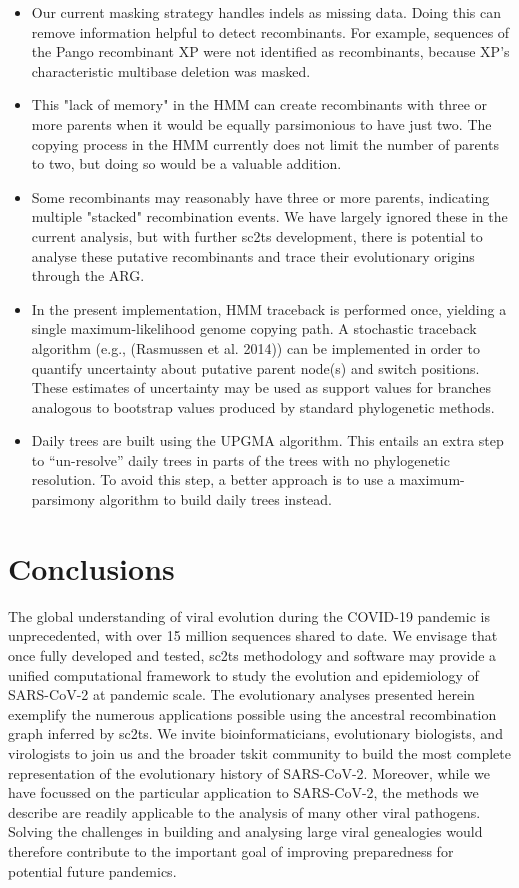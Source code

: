 \documentclass{article}
\begin{document}
\begin{itemize}
\item Our current masking strategy handles indels as missing data. Doing this can remove information helpful to detect recombinants. For example, sequences of the Pango recombinant XP were not identified as recombinants, because XP’s characteristic multibase deletion was masked.
\item This "lack of memory" in the HMM can create recombinants with three or more parents when it would be equally parsimonious to have just two. The copying process in the HMM currently does not limit the number of parents to two, but doing so would be a valuable addition.
\item Some recombinants may reasonably have three or more parents, indicating multiple "stacked" recombination events. We have largely ignored these in the current analysis, but with further sc2ts development, there is potential to analyse these putative recombinants and trace their evolutionary origins through the ARG.
\item In the present implementation, HMM traceback is performed once, yielding a single maximum-likelihood genome copying path. A stochastic traceback algorithm (e.g., (Rasmussen et al. 2014)) can be implemented in order to quantify uncertainty about putative parent node(s) and switch positions. These estimates of uncertainty may be used as support values for branches analogous to bootstrap values produced by standard phylogenetic methods.
\item Daily trees are built using the UPGMA algorithm. This entails an extra step to “un-resolve” daily trees in parts of the trees with no phylogenetic resolution. To avoid this step, a better approach is to use a maximum-parsimony algorithm to build daily trees instead.
\end{itemize}

\section{Conclusions}

The global understanding of viral evolution during the COVID-19 pandemic is unprecedented, with over 15 million sequences shared to date. We envisage that once fully developed and tested, sc2ts methodology and software may provide a unified computational framework to study the evolution and epidemiology of SARS-CoV-2 at pandemic scale. The evolutionary analyses presented herein exemplify the numerous applications possible using the ancestral recombination graph inferred by sc2ts. We invite bioinformaticians, evolutionary biologists, and virologists to join us and the broader tskit community to build the most complete representation of the evolutionary history of SARS-CoV-2. Moreover, while we have focussed on the particular application to SARS-CoV-2, the methods we describe are readily applicable to the analysis of many other viral pathogens. Solving the challenges in building and analysing large viral genealogies would therefore contribute to the important goal of improving preparedness for potential future pandemics.
\end{document}
